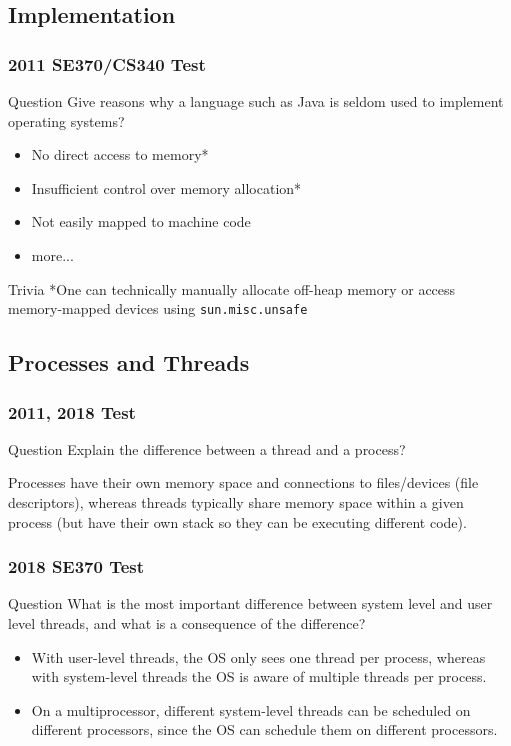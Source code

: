 \documentclass{beamer}
\begin{document}
\subsection{Implementation}
\begin{frame}
  \frametitle{2011 SE370/CS340 Test}
  \begin{block}{Question}
    Give reasons why a language such as Java is seldom used to implement operating systems?
  \end{block}
  \pause
  \begin{itemize}
    \item No direct access to memory*
    \item Insufficient control over memory allocation*
    \item Not easily mapped to machine code
    \item more...
  \end{itemize}
  \begin{exampleblock}{Trivia}
    *One can technically manually allocate off-heap memory or access memory-mapped devices using \texttt{sun.misc.unsafe}
  \end{exampleblock}
\end{frame}
\subsection{Processes and Threads}
\begin{frame}
  \frametitle{2011, 2018 Test}
  \begin{block}{Question}
    Explain the difference between a thread and a process?
  \end{block}
  \pause
  Processes have their own memory space and connections to files/devices (file descriptors), whereas threads typically share memory space within a given process (but have their own stack so they can be executing different code).
\end{frame}
\begin{frame}
  \frametitle{2018 SE370 Test}
  \begin{block}{Question}
    What is the most important difference between system level and user level threads, and what is a consequence of the difference?
  \end{block}
  \pause
  \begin{itemize}
    \item With user-level threads, the OS only sees one thread per process, whereas with system-level threads the OS is aware of multiple threads per process.
    \item On a multiprocessor, different system-level threads can be scheduled on different processors, since the OS can schedule them on different processors.
  \end{itemize}
\end{frame}
\end{document}
